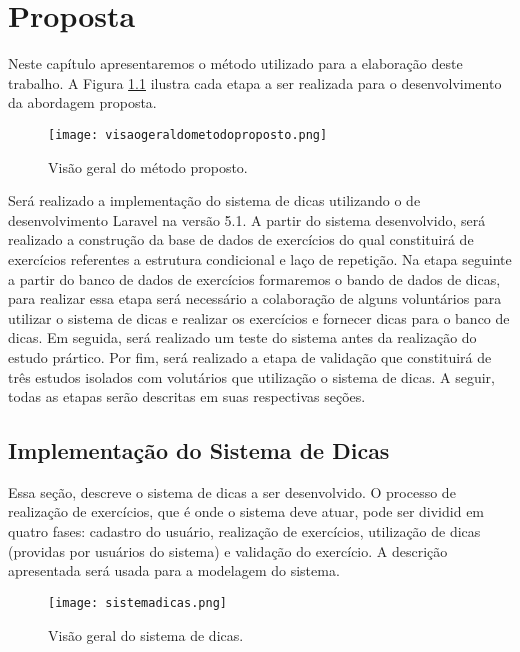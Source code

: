 \chapter{Proposta}

Neste capítulo apresentaremos o método utilizado para a elaboração deste trabalho. A Figura \ref{figura:visaometodo} ilustra cada etapa a ser realizada para o desenvolvimento da abordagem proposta.

\begin{figure}[h]
	\centering
	\texttt{[image: visaogeraldometodoproposto.png]}
	\caption{Visão geral do método proposto.}
	\label{figura:visaometodo}
\end{figure}

Será realizado a implementação do sistema de dicas utilizando o  de desenvolvimento Laravel na versão 5.1. A partir do sistema desenvolvido, será realizado a construção da base de dados de exercícios do qual constituirá de exercícios referentes a estrutura condicional e laço de repetição. Na etapa seguinte a partir do banco de dados de exercícios formaremos o bando de dados de dicas, para realizar essa etapa será necessário a colaboração de alguns voluntários para utilizar o sistema de dicas e realizar os exercícios e fornecer dicas para o banco de dicas. Em seguida, será realizado um teste do sistema antes da realização do estudo prártico. Por fim, será realizado a etapa de validação que constituirá de três estudos isolados com volutários que utilização o sistema de dicas. A seguir, todas as etapas serão descritas em
suas respectivas seções.

\section{Implementação do Sistema de Dicas}

Essa seção, descreve o sistema de dicas a ser desenvolvido. O processo de realização de exercícios, que é onde o sistema deve atuar, pode ser dividid em quatro fases: cadastro do usuário, realização de exercícios, utilização de dicas (providas por usuários do sistema) e validação do exercício. A descrição apresentada será usada para a modelagem do sistema.

\begin{figure}[h]
	\centering
	\texttt{[image: sistemadicas.png]}
	\caption{Visão geral do sistema de dicas.}
	\label{figura:sistemadicas}
\end{figure}

